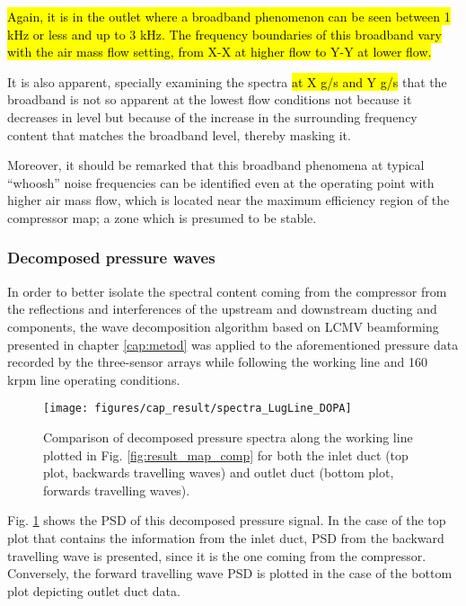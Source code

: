 \hl{Again, it is in the outlet where a broadband phenomenon can be seen between 1 kHz or less and up to 3 kHz. The frequency boundaries of this broadband vary with the air mass flow setting, from X-X at higher flow to Y-Y at lower flow.} 

It is also apparent, specially examining the spectra \hl{at X g/s and Y g/s} that the broadband is not so apparent at the lowest flow conditions not because it decreases in level but because of the increase in the surrounding frequency content that matches the broadband level, thereby masking it. 

Moreover, it should be remarked that this broadband phenomena at typical ``whoosh'' noise frequencies can be identified even at the operating point with higher air mass flow, which is located near the maximum efficiency region of the compressor map; a zone which is presumed to be stable.

\subsubsection{Decomposed pressure waves}

In order to better isolate the spectral content coming from the compressor from the reflections and interferences of the upstream and downstream ducting and components, the wave decomposition algorithm based on LCMV beamforming presented in chapter \ref{cap:metod} was applied to the aforementioned pressure data recorded by the three-sensor arrays while following the working line and 160 krpm line operating conditions.

\begin{figure}[tbh!]
\centering
\texttt{[image: figures/cap\_result/spectra\_LugLine\_DOPA]}
\caption{Comparison of decomposed pressure spectra along the working line plotted in Fig. \ref{fig:result_map_comp} for both the inlet duct (top plot, backwards travelling waves) and outlet duct (bottom plot, forwards travelling waves).}
\label{fig:result_spectra_LugLine_DOPA}
\end{figure}

Fig. \ref{fig:result_spectra_LugLine_DOPA} shows the PSD of this decomposed pressure signal. In the case of the top plot that contains the information from the inlet duct, PSD from the backward travelling wave is presented, since it is the one coming from the compressor. Conversely, the forward travelling wave PSD is plotted in the case of the bottom plot depicting outlet duct data.

